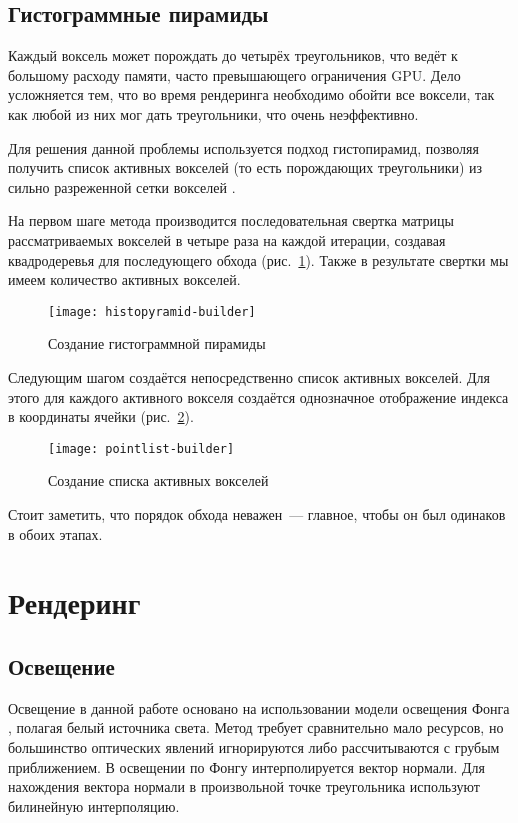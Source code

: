 \subsection{Гистограммные пирамиды}
Каждый воксель может порождать до четырёх треугольников, что ведёт к большому расходу памяти, часто превышающего ограничения GPU. Дело усложняется тем, что во время рендеринга необходимо обойти все воксели, так как любой из них мог дать треугольники, что очень неэффективно.

Для решения данной проблемы используется подход гистопирамид, позволяя получить список активных вокселей (то есть порождающих треугольники) из сильно разреженной сетки вокселей \cite{ziegler}.

На первом шаге метода производится последовательная свертка матрицы рассматриваемых вокселей в четыре раза на каждой итерации, создавая квадродеревья для последующего обхода (рис.~\ref{fig:histopyramid-builder}). Также в результате свертки мы имеем количество активных вокселей.

\begin{figure}[h]
  \centering
  \texttt{[image: histopyramid-builder]}
  \caption{Создание гистограммной пирамиды}
  \label{fig:histopyramid-builder}
\end{figure}

Следующим шагом создаётся непосредственно список активных вокселей. Для этого для каждого активного вокселя создаётся однозначное отображение индекса в координаты ячейки (рис.~\ref{fig:pointlist-builder}).

\begin{figure}[h]
  \centering
  \texttt{[image: pointlist-builder]}
  \caption{Создание списка активных вокселей}
  \label{fig:pointlist-builder}
\end{figure}

Стоит заметить, что порядок обхода неважен~--- главное, чтобы он был одинаков в обоих этапах.


\section{Рендеринг}
\subsection{Освещение}
Освещение в данной работе основано на использовании модели освещения Фонга \cite{phong}, полагая белый источника света. Метод требует сравнительно мало ресурсов, но большинство оптических явлений игнорируются либо рассчитываются с грубым приближением. В освещении по Фонгу интерполируется вектор нормали. Для нахождения вектора нормали в произвольной точке треугольника используют билинейную интерполяцию.

